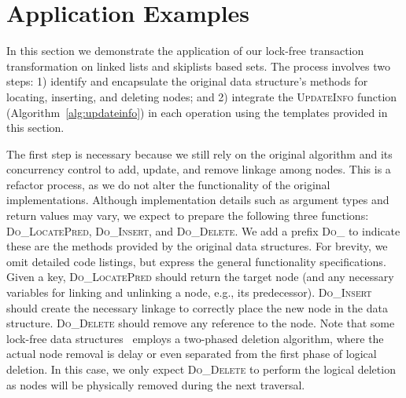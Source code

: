 \documentclass[]{sig-alternate-05-2015}
\begin{document}
\section{Application Examples}
\label{sec:application}
In this section we demonstrate the application of our lock-free transaction transformation on linked lists and skiplists based sets. 
The process involves two steps: 1) identify and encapsulate the original data structure's methods for locating, inserting, and deleting nodes; and 2) integrate the \textsc{UpdateInfo} function (Algorithm~\ref{alg:updateinfo}) in each operation using the templates provided in this section.

The first step is necessary because we still rely on the original algorithm and its concurrency control to add, update, and remove linkage among nodes.
This is a refactor process, as we do not alter the functionality of the original implementations. 
Although implementation details such as argument types and return values may vary, we expect to prepare the following three functions: \textsc{Do\_LocatePred}, \textsc{Do\_Insert}, and \textsc{Do\_Delete}.
We add a prefix \textsc{Do\_} to indicate these are the methods provided by the original data structures.
For brevity, we omit detailed code listings, but express the general functionality specifications.
Given a key, \textsc{Do\_LocatePred} should return the target node (and any necessary variables for linking and unlinking a node, e.g., its predecessor).
\textsc{Do\_Insert} should create the necessary linkage to correctly place the new node in the data structure.
\textsc{Do\_Delete} should remove any reference to the node.
Note that some lock-free data structures~\cite{harris2001pragmatic,fraser2004practical} employs a two-phased deletion algorithm, where the actual node removal is delay or even separated from the first phase of logical deletion.
In this case, we only expect \textsc{Do\_Delete} to perform the logical deletion as nodes will be physically removed during the next traversal.
\end{document}
